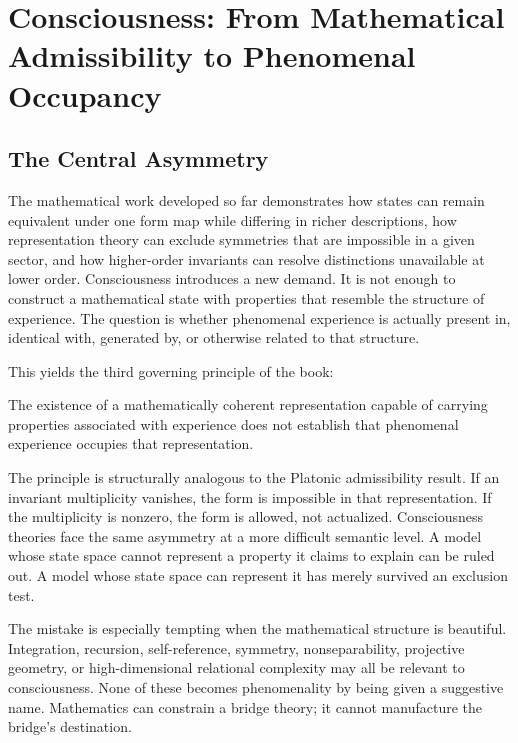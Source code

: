 \chapter{Consciousness: From Mathematical Admissibility to Phenomenal Occupancy}

\section{The Central Asymmetry}

The mathematical work developed so far demonstrates how states can remain equivalent under one form map while differing in richer descriptions, how representation theory can exclude symmetries that are impossible in a given sector, and how higher-order invariants can resolve distinctions unavailable at lower order. Consciousness introduces a new demand. It is not enough to construct a mathematical state with properties that resemble the structure of experience. The question is whether phenomenal experience is actually present in, identical with, generated by, or otherwise related to that structure.

This yields the third governing principle of the book:

\begin{principle}
The existence of a mathematically coherent representation capable of carrying properties associated with experience does not establish that phenomenal experience occupies that representation.
\end{principle}

The principle is structurally analogous to the Platonic admissibility result. If an invariant multiplicity vanishes, the form is impossible in that representation. If the multiplicity is nonzero, the form is allowed, not actualized. Consciousness theories face the same asymmetry at a more difficult semantic level. A model whose state space cannot represent a property it claims to explain can be ruled out. A model whose state space can represent it has merely survived an exclusion test.

The mistake is especially tempting when the mathematical structure is beautiful. Integration, recursion, self-reference, symmetry, nonseparability, projective geometry, or high-dimensional relational complexity may all be relevant to consciousness. None of these becomes phenomenality by being given a suggestive name. Mathematics can constrain a bridge theory; it cannot manufacture the bridge's destination.

